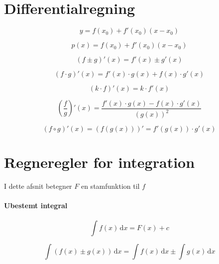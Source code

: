 \documentclass[11pt,a4paper,landscape,twocolumn,fleqn,leqno]{article}
\begin{document}
\section{Differentialregning}

\begin{equation}
y = f(x_0) + f'(x_0)(x-x_0)
\end{equation}

\begin{equation}
p(x) = f(x_0) + f'(x_0)(x-x_0)
\end{equation}

\begin{equation}
\left(f \pm g\right)'(x) = f'(x) \pm g'(x)
\end{equation}

\begin{equation}
\left(f \cdot g\right)'(x) = f'(x) \cdot g(x) + f(x) \cdot g'(x)
\end{equation}

\begin{equation}
\left(k \cdot f\right)'(x) = k \cdot f'(x)
\end{equation}

\begin{equation}
\left(\frac{f}{g}\right)'(x) = \frac{f'(x) \cdot g(x) - f(x) \cdot g'(x)}{\left(g(x)\right)^2}
\end{equation}

\begin{equation}
\left(f \circ g\right)'(x) = \left(f\left(g(x)\right)\right)' = f'\left(g(x)\right) \cdot g'(x)
\end{equation}

\section{Regneregler for integration}

I dette afsnit betegner $F$ en stamfunktion til $f$

\paragraph{Ubestemt integral}

\begin{equation}
\int f(x)\, \mathrm{d}x = F(x) + c
\end{equation}

\begin{equation}
\int \left(f(x) \pm g(x)\right)\, \mathrm{d}x = \int f(x)\, \mathrm{d}x \pm \int g(x)\, \mathrm{d}x
\end{equation}
\end{document}
